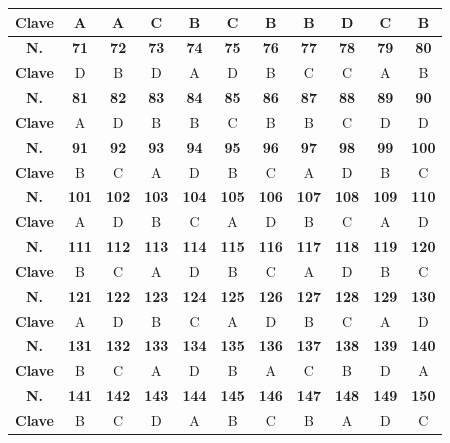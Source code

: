 \begin{center}
\begin{tabular}{|c|c|c|c|c|c|c|c|c|c|c|}
\hline
\textbf{Clave} & A & A & C & B & C & B & B & D & C & B \\
\hline
\textbf{N.} & \textbf{71} & \textbf{72} & \textbf{73} & \textbf{74} & \textbf{75} & \textbf{76} & \textbf{77} & \textbf{78} & \textbf{79} & \textbf{80} \\
\hline
\textbf{Clave} & D & B & D & A & D & B & C & C & A & B \\
\hline
\textbf{N.} & \textbf{81} & \textbf{82} & \textbf{83} & \textbf{84} & \textbf{85} & \textbf{86} & \textbf{87} & \textbf{88} & \textbf{89} & \textbf{90} \\
\hline
\textbf{Clave} & A & D & B & B & C & B & B & C & D & D \\
\hline
\textbf{N.} & \textbf{91} & \textbf{92} & \textbf{93} & \textbf{94} & \textbf{95} & \textbf{96} & \textbf{97} & \textbf{98} & \textbf{99} & \textbf{100} \\
\hline
\textbf{Clave} & B & C & A & D & B & C & A & D & B & C \\
\hline
\textbf{N.} & \textbf{101} & \textbf{102} & \textbf{103} & \textbf{104} & \textbf{105} & \textbf{106} & \textbf{107} & \textbf{108} & \textbf{109} & \textbf{110} \\
\hline
\textbf{Clave} & A & D & B & C & A & D & B & C & A & D \\
\hline
\textbf{N.} & \textbf{111} & \textbf{112} & \textbf{113} & \textbf{114} & \textbf{115} & \textbf{116} & \textbf{117} & \textbf{118} & \textbf{119} & \textbf{120} \\
\hline
\textbf{Clave} & B & C & A & D & B & C & A & D & B & C \\
\hline
\textbf{N.} & \textbf{121} & \textbf{122} & \textbf{123} & \textbf{124} & \textbf{125} & \textbf{126} & \textbf{127} & \textbf{128} & \textbf{129} & \textbf{130} \\
\hline
\textbf{Clave} & A & D & B & C & A & D & B & C & A & D \\
\hline
\textbf{N.} & \textbf{131} & \textbf{132} & \textbf{133} & \textbf{134} & \textbf{135} & \textbf{136} & \textbf{137} & \textbf{138} & \textbf{139} & \textbf{140} \\
\hline
\textbf{Clave} & B & C & A & D & B & A & C & B & D & A \\
\hline
\textbf{N.} & \textbf{141} & \textbf{142} & \textbf{143} & \textbf{144} & \textbf{145} & \textbf{146} & \textbf{147} & \textbf{148} & \textbf{149} & \textbf{150} \\
\hline
\textbf{Clave} & B & C & D & A & B & C & B & A & D & C \\

\end{tabular}
\end{center}
